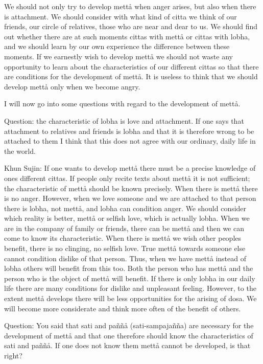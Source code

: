 \documentclass[12pt,twoside]{article}
\begin{document}
We should not only try to develop mett{\aa} when anger arises, but also
when there is attachment. We should consider with what kind of citta we
think of our friends, our circle of relatives, those who are near and
dear to us. We should find out whether there are at such moments cittas
with mett{\aa} or cittas with lobha, and we should learn by our own
experience the difference between these moments. If we earnestly wish
to develop mett{\aa} we should not waste any opportunity to learn about
the characteristics of our different cittas so that there are
conditions for the development of mett{\aa}. It is useless to think
that we should develop mett{\aa} only when we become angry. 

I will now go into some questions with regard to the development of
mett{\aa}. 

Question: the characteristic of lobha is love and attachment. If one
says that attachment to relatives and friends is lobha and that it is
therefore wrong to be attached to them I think that this does not agree
with our ordinary, daily life in the world. 

Khun Sujin: If one wants to develop mett{\aa} there must be a precise
knowledge of one{\textquotesingle}s different cittas. If people only
recite texts about mett{\aa} it is not sufficient; the characteristic
of mett{\aa} should be known precisely. When there is mett{\aa} there
is no anger. However, when we love someone and we are attached to that
person there is lobha, not mett{\aa}, and lobha can condition anger. We
should consider which reality is better, mett{\aa} or selfish love,
which is actually lobha. When we are in the company of family or
friends, there can be mett{\aa} and then we can come to know its
characteristic. When there is mett{\aa} we wish other
people{\textquotesingle}s benefit, there is no clinging, no selfish
love. True mett{\aa} towards someone else cannot condition dislike of
that person. Thus, when we have mett{\aa} instead of lobha others will
benefit from this too. Both the person who has mett{\aa} and the person
who is the object of mett{\aa} will benefit. If there is only lobha in
our daily life there are many conditions for dislike and unpleasant
feeling. However, to the extent mett{\aa} develops there will be less
opportunities for the arising of dosa. We will become more considerate
and think more often of the benefit of others. 

Question: You said that sati and pa\~n\~n{\aa} (sati{}-sampaja\~n\~na)
are necessary for the development of mett{\aa} and that one therefore
should know the characteristics of sati and pa\~n\~n{\aa}. If one does
not know them mett{\aa} cannot be developed, is that right?
\end{document}

